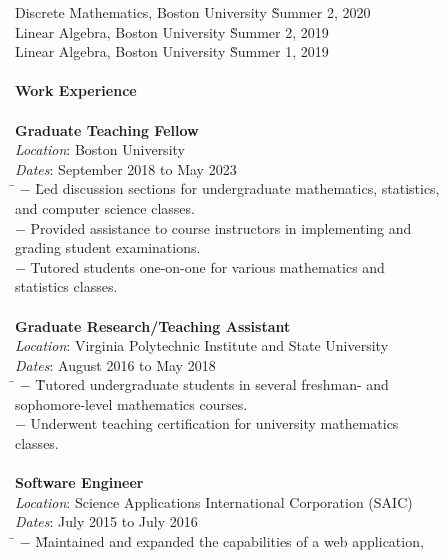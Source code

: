 \begin{center}
\begin{tabbing}
	\> Discrete Mathematics, Boston University  \` Summer 2, 2020 \\
	\> Linear Algebra, Boston University  \`Summer 2, 2019 \\
	\> Linear Algebra, Boston University   \`Summer 1, 2019 \\
	\\
	\textbf{\large{Work Experience}}  \\ 
	\> \\
	\> \textbf{Graduate Teaching Fellow} \\
	\> \> \emph{Location}: Boston University \\
	\> \> \emph{Dates}: September 2018 to May 2023 \\
	\> \>  \hspace{1em} \= $-$ \= Led discussion sections for undergraduate mathematics, statistics, \\
	\> \> \> \>  and computer science classes. \\ 
	\> \> \> $-$ Provided assistance to course instructors in implementing and \\
	\> \> \> \>grading student examinations. \\
	\> \> \> $-$ Tutored students one-on-one for various mathematics and \\
	\> \> \> \> statistics classes. \\
	\> \\
	\> \textbf{Graduate Research/Teaching Assistant} \\
	\> \> \emph{Location}: Virginia Polytechnic Institute and State University \\
	\> \> \emph{Dates}: August 2016 to May 2018 \\
	\> \>  \hspace{1em} \= $-$ \=Tutored undergraduate students in several freshman- and \\
	\> \> \> \> sophomore-level mathematics courses. \\
	\> \> \> $-$ Underwent teaching certification for university mathematics \\
	\> \> \> \> classes. \\
	\> \\ 
	\> \textbf{Software Engineer} \\
	\> \> \emph{Location}: Science Applications International Corporation (SAIC) \\
	\> \> \emph{Dates}: July 2015 to July 2016 \\
	\> \> \hspace{1em} \= $-$ \=Maintained and expanded the capabilities of a web application, \\

\end{tabbing}
\end{center}
